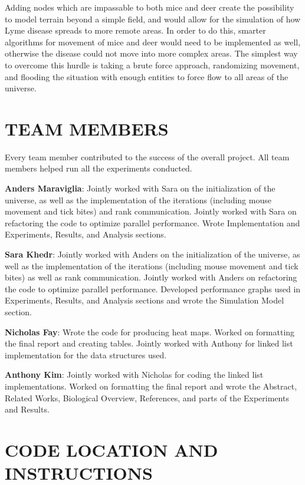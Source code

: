 \documentclass[letterpaper, 10 pt, conference]{ieeeconf}  %
\begin{document}
Adding nodes which are impassable to both mice and deer create the possibility to model terrain beyond a simple field, and would allow for the simulation of how Lyme disease spreads to more remote areas.  In order to do this, smarter algorithms for movement of mice and deer would need to be implemented as well, otherwise the disease could not move into more complex areas.  The simplest way to overcome this hurdle is taking a brute force approach, randomizing movement, and flooding the situation with enough entities to force flow to all areas of the universe.  

\section*{TEAM MEMBERS}

Every team member contributed to the success of the overall project.  All team members helped run all the experiments conducted.

\textbf{Anders Maraviglia}: Jointly worked with Sara on the initialization of the universe, as well as the implementation of the iterations (including mouse movement and tick bites) and rank communication. Jointly worked with Sara on refactoring the code to optimize parallel performance. Wrote Implementation and Experiments, Results, and Analysis sections.

\textbf{Sara Khedr}: Jointly worked with Anders on the initialization of the universe, as well as the implementation of the iterations (including mouse movement and tick bites) as well as rank communication. Jointly worked with Anders on refactoring the code to optimize parallel performance. Developed performance graphs used in Experiments, Results, and Analysis sections and wrote the Simulation Model section.

\textbf{Nicholas Fay}: Wrote the code for producing heat maps.  Worked on formatting the final report and creating tables.  Jointly worked with Anthony for linked list implementation for the data structures used.

\textbf{Anthony Kim}:  Jointly worked with Nicholas for coding the linked list implementations.  Worked on formatting the final report and wrote the Abstract, Related Works, Biological Overview, References, and parts of the Experiments and Results.  


\section*{CODE LOCATION AND INSTRUCTIONS}
\end{document}
